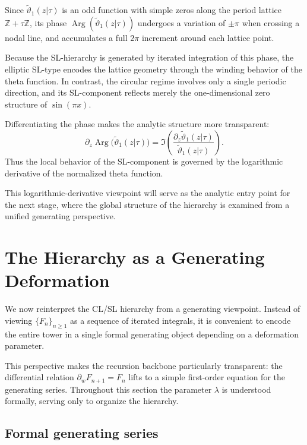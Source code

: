 \documentclass[11pt]{article}
\DeclareMathOperator{\Arg}{Arg}
\begin{document}
Since $\widetilde{\vartheta}_1(z|\tau)$ is an odd function with simple zeros
along the period lattice $\mathbb{Z}+\tau\mathbb{Z}$,
its phase $\Arg(\widetilde{\vartheta}_1(z|\tau))$
undergoes a variation of $\pm\pi$ when crossing a nodal line,
and accumulates a full $2\pi$ increment around each lattice point.

Because the SL-hierarchy is generated by iterated integration of this phase,
the elliptic SL-type encodes the lattice geometry through the winding behavior
of the theta function.
In contrast, the circular regime involves only a single periodic direction,
and its SL-component reflects merely the one-dimensional zero structure of $\sin(\pi x)$.

\medskip

Differentiating the phase makes the analytic structure more transparent:
\[
\partial_z \Arg\bigl(\widetilde{\vartheta}_1(z|\tau)\bigr)
=
\Im\!\left(
\frac{\partial_z \widetilde{\vartheta}_1(z|\tau)}
     {\widetilde{\vartheta}_1(z|\tau)}
\right).
\]
Thus the local behavior of the SL-component is governed by the
logarithmic derivative of the normalized theta function.

\medskip

This logarithmic-derivative viewpoint will serve as the analytic entry point
for the next stage, where the global structure of the hierarchy
is examined from a unified generating perspective.


\section{The Hierarchy as a Generating Deformation}

We now reinterpret the CL/SL hierarchy from a generating viewpoint.
Instead of viewing $\{F_n\}_{n\ge1}$ as a sequence of iterated integrals,
it is convenient to encode the entire tower in a single formal generating
object depending on a deformation parameter.

This perspective makes the recursion backbone particularly transparent:
the differential relation $\partial_w F_{n+1}=F_n$ lifts to a simple
first-order equation for the generating series.
Throughout this section the parameter $\lambda$ is understood formally,
serving only to organize the hierarchy.


\subsection{Formal generating series}
\end{document}
